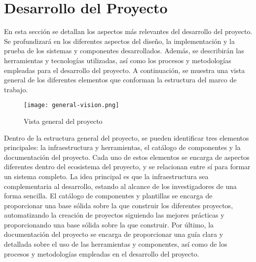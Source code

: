 \section{Desarrollo del Proyecto}
En esta sección se detallan los aspectos más relevantes del desarrollo del proyecto.
Se profundizará en los diferentes aspectos del diseño, la implementación y la
prueba de los sistemas y componentes desarrollados. Además, se describirán las
herramientas y tecnologías utilizadas, así como los procesos y metodologías
empleadas para el desarrollo del proyecto. A continuación, se muestra una vista general de los diferentes elementos
que conforman la estructura del marco de trabajo.

\begin{figure}[ht]
    \centering
    \texttt{[image: general-vision.png]}
    \caption{Vista general del proyecto}\label{fig:general-vision}
\end{figure}

Dentro de la estructura general del proyecto, se pueden identificar tres elementos
principales: la infraestructura y herramientas, el catálogo de componentes y la
documentación del proyecto. Cada uno de estos elementos se encarga de aspectos
diferentes dentro del ecosistema del proyecto, y se relacionan entre sí para formar
un sistema completo. La idea principal es que la infraestructura sea complementaria
al desarrollo, estando al alcance de los investigadores de una forma sencilla. El catálogo
de componentes y plantillas se encarga de proporcionar una base sólida sobre la que
construir los diferentes proyectos, automatizando la creación de proyectos siguiendo 
las mejores prácticas y proporcionando una base sólida sobre la que construir. Por último,
la documentación del proyecto se encarga de proporcionar una guía clara y detallada
sobre el uso de las herramientas y componentes, así como de los procesos y metodologías
empleadas en el desarrollo del proyecto.






\pagebreak